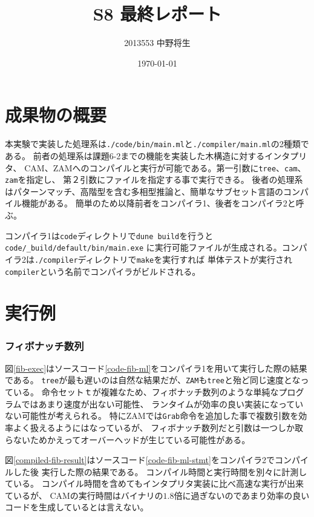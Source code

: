 \documentclass[report]{jlreq}
\author{2013553 中野将生}
\date{\today}
\title{S8 最終レポート}
\begin{document}
  \maketitle
  \chapter{成果物の概要}
    本実験で実装した処理系は\texttt{./code/bin/main.ml}と\texttt{./compiler/main.ml}の2種類である。
    前者の処理系は課題6-2までの機能を実装した木構造に対するインタプリタ、
    CAM、ZAMへのコンパイルと実行が可能である。第一引数に\texttt{tree}、\texttt{cam}、\texttt{zam}を指定し、
    第２引数にファイルを指定する事で実行できる。
    後者の処理系はパターンマッチ、高階型を含む多相型推論と、簡単なサブセット言語のコンパイル機能がある。
    簡単のため以降前者をコンパイラ1、後者をコンパイラ2と呼ぶ。

    コンパイラ1は\texttt{code}ディレクトリで\texttt{dune build}を行うと\texttt{code/\_build/default/bin/main.exe}
    に実行可能ファイルが生成される。コンパイラ2は\texttt{./compiler}ディレクトリで\texttt{make}を実行すれば
    単体テストが実行され\texttt{compiler}という名前でコンパイラがビルドされる。
  \chapter{実行例}
    \subsection{フィボナッチ数列}
      図\ref{fib-exec}はソースコード\ref{code-fib-ml}をコンパイラ1を用いて実行した際の結果である。
      \texttt{tree}が最も遅いのは自然な結果だが、\texttt{ZAM}も\texttt{tree}と殆ど同じ速度となっている。
      命令セットｔが複雑なため、フィボナッチ数列のような単純なプログラムではあまり速度が出ない可能性、
      ランタイムが効率の良い実装になっていない可能性が考えられる。
      特にZAMでは\texttt{Grab}命令を追加した事で複数引数を効率よく扱えるようにはなっているが、
      フィボナッチ数列だと引数は一つしか取らないためかえってオーバーヘッドが生じている可能性がある。
      
      

      図\ref{compiled-fib-result}はソースコード\ref{code-fib-ml-stmt}をコンパイラ2でコンパイルした後
      実行した際の結果である。
      コンパイル時間と実行時間を別々に計測している。
      コンパイル時間を含めてもインタプリタ実装に比べ高速な実行が出来ているが、
      CAMの実行時間はバイナリの$1.8$倍に過ぎないのであまり効率の良いコードを生成しているとは言えない。
      
      
\end{document}
